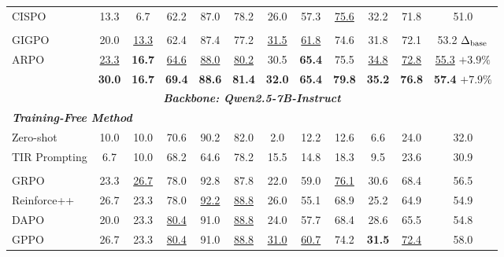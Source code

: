 \documentclass{llmxive}
\begin{document}
\begin{table}[t]
{\begin{tabular}{cccccccccccc}
\multicolumn{1}{l}{CISPO} & 13.3 & 6.7 & 62.2 & 87.0 & \multicolumn{1}{c}{78.2} & 26.0 & 57.3 & \underline{75.6} & 32.2 & \multicolumn{1}{c}{71.8} & 51.0 \\ \hdashline
\multicolumn{12}{l}{\textbf{\textit{Agentic RL Method}}} \\
\multicolumn{1}{l}{GIGPO} & 20.0 & \underline{13.3} & 62.4 & 87.4 & \multicolumn{1}{c}{77.2} & \underline{31.5} & \underline{61.8} & 74.6 & 31.8 & \multicolumn{1}{c}{72.1} & 53.2 $\Delta_{\rm base}$\\
\multicolumn{1}{l}{ARPO} & \underline{23.3} & \textbf{16.7} & \underline{64.6} & \underline{88.0} & \multicolumn{1}{c}{\underline{80.2}} & 30.5 & \textbf{65.4} & 75.5 & \underline{34.8} & \multicolumn{1}{c}{\underline{72.8}} & \underline{55.3} \tiny $+3.9\%$\\ 
\rowcolor{gray!20}
\multicolumn{1}{l}{\textbf{APPO (Ours)}} & \textbf{30.0} & \textbf{16.7} & \textbf{69.4}  & \textbf{88.6} & \multicolumn{1}{c}{\textbf{81.4}} & \textbf{32.0} & \textbf{65.4} & \textbf{79.8} & \textbf{35.2} & \multicolumn{1}{c}{\textbf{76.8}} & \textbf{57.4} \tiny $+7.9\%$\\ \hline
\multicolumn{12}{c}{\textbf{\textit{Backbone: Qwen2.5-7B-Instruct}}} \\ \hline
\multicolumn{12}{l}{\textit{\textbf{Training-Free Method}}} \\
\multicolumn{1}{l}{Zero-shot} & 10.0 & 10.0 & 70.6 & 90.2 & \multicolumn{1}{c}{82.0} & 2.0 & 12.2 & 12.6 & 6.6 & \multicolumn{1}{c}{24.0} & 32.0 \\
\multicolumn{1}{l}{TIR Prompting} & 6.7 & 10.0 & 68.2 & 64.6 & \multicolumn{1}{c}{78.2} & 15.5 & 14.8 & 18.3 & 9.5 & \multicolumn{1}{c}{23.6} & 30.9 \\ \hdashline
\multicolumn{12}{l}{\textbf{\textit{Classic RL Method}}} \\
\multicolumn{1}{l}{GRPO} & 23.3 & \underline{26.7} & 78.0 & 92.8 & \multicolumn{1}{c}{87.8} & 22.0 & 59.0 & \underline{76.1} & 30.6 & \multicolumn{1}{c}{68.4} & 56.5 \\
\multicolumn{1}{l}{Reinforce++} & 26.7 & 23.3 & 78.0 & \underline{92.2} & \multicolumn{1}{c}{\underline{88.8}} & 26.0 & 55.1 & 68.9 & 25.2 & \multicolumn{1}{c}{64.9} & 54.9 \\
\multicolumn{1}{l}{DAPO} & 20.0 & 23.3 & \underline{80.4} & 91.0 & \multicolumn{1}{c}{\underline{88.8}} & 24.0 & 57.7 & 68.4 & 28.6 & \multicolumn{1}{c}{65.5} & 54.8 \\
\multicolumn{1}{l}{GPPO} & 26.7 & 23.3 & \underline{80.4} & 91.0 & \multicolumn{1}{c}{\underline{88.8}} & \underline{31.0} & \underline{60.7} & 74.2 & \textbf{31.5} & \multicolumn{1}{c}{\underline{72.4}} & 58.0 \\

\end{tabular}}
\end{table}
\end{document}

